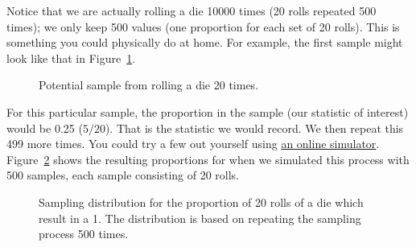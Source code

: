 \documentclass[
  letterpaper,
  DIV=11,
  numbers=noendperiod]{scrreprt}
\theoremstyle{plain}
\theoremstyle{definition}
\theoremstyle{definition}
\theoremstyle{remark}
\begin{document}
Notice that we are actually rolling a die 10000 times (20 rolls repeated
500 times); we only keep 500 values (one proportion for each set of 20
rolls). This is something you could physically do at home. For example,
the first sample might look like that in
Figure~\ref{fig-samplingdistns-dice-example}.

\begin{figure}


\caption{\label{fig-samplingdistns-dice-example}Potential sample from
rolling a die 20 times.}

\end{figure}%

For this particular sample, the proportion in the sample (our statistic
of interest) would be 0.25 (\(5/20\)). That is the statistic we would
record. We then repeat this 499 more times. You could try a few out
yourself using \href{https://www.random.org/dice/?num=20}{an online
simulator}. Figure~\ref{fig-samplingdistns-dice-dotplot} shows the
resulting proportions for when we simulated this process with 500
samples, each sample consisting of 20 rolls.

\begin{figure}


\caption{\label{fig-samplingdistns-dice-dotplot}Sampling distribution
for the proportion of 20 rolls of a die which result in a 1. The
distribution is based on repeating the sampling process 500 times.}

\end{figure}%
\end{document}
